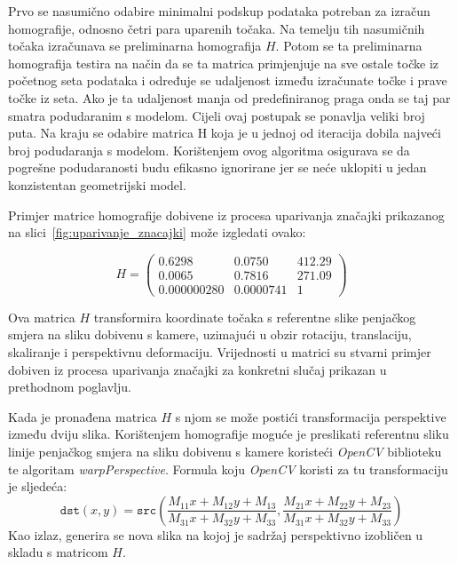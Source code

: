 Prvo se nasumično odabire minimalni podskup podataka potreban za izračun homografije, odnosno četri para uparenih točaka. Na temelju tih nasumičnih točaka izračunava se preliminarna homografija $H$. Potom se ta preliminarna homografija testira na način da se ta matrica primjenjuje na sve ostale točke iz početnog seta podataka i određuje se udaljenost između izračunate točke i prave točke iz seta. Ako je ta udaljenost manja od predefiniranog praga onda se taj par smatra podudaranim s modelom. Cijeli ovaj postupak se ponavlja veliki broj puta. 
Na kraju se odabire matrica H koja je u jednoj od iteracija dobila najveći broj podudaranja s modelom. Korištenjem ovog algoritma osigurava se da pogrešne podudaranosti budu efikasno ignorirane jer se neće uklopiti u jedan konzistentan geometrijski model.

Primjer matrice homografije dobivene iz procesa uparivanja značajki prikazanog na slici~\ref{fig:uparivanje_znacajki} može izgledati ovako:


\begin{equation}
    H =
    \begin{pmatrix}
        0.6298 & 0.0750 & 412.29 \\
        0.0065 & 0.7816 & 271.09 \\
        0.000000280 & 0.0000741 & 1
    \end{pmatrix}
\end{equation}

Ova matrica $H$ transformira koordinate točaka s referentne slike penjačkog smjera na sliku dobivenu s kamere, uzimajući u obzir rotaciju, translaciju, skaliranje i perspektivnu deformaciju. Vrijednosti u matrici su stvarni primjer dobiven iz procesa uparivanja značajki za konkretni slučaj prikazan u prethodnom poglavlju.




Kada je pronađena matrica $H$ s njom se može postići transformacija perspektive između dviju slika. Korištenjem homografije moguće je preslikati referentnu sliku linije penjačkog smjera na sliku dobivenu s kamere koristeći \textit{OpenCV} biblioteku te algoritam \textit{warpPerspective}. Formula koju \textit{OpenCV} koristi za tu transformaciju je sljedeća:
\begin{equation}
    \texttt{dst}(x,y) = \texttt{src} \left ( \frac{M_{11} x + M_{12} y + M_{13}}{M_{31} x + M_{32} y + M_{33}} ,
     \frac{M_{21} x + M_{22} y + M_{23}}{M_{31} x + M_{32} y + M_{33}} \right )
\end{equation}
Kao izlaz, generira se nova slika na kojoj je sadržaj perspektivno izobličen u skladu s matricom $H$. 

